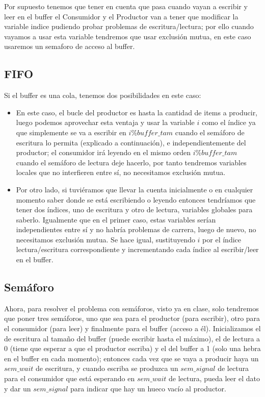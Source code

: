 \documentclass[11pt]{article}
\theoremstyle{ejercicio-style}
\begin{document}
Por supuesto tenemos que tener en cuenta que pasa cuando vayan a escribir y leer en el buffer el Consumidor y el Productor van a tener que modificar la variable indice pudiendo probar problemas de escritura/lectura; por ello cuando vayamos a usar esta variable tendremos que usar exclusión mutua, en este caso usaremos un semaforo de acceso al buffer.
\subsection*{FIFO}
\label{sec::lifo}
Si el buffer es una cola, tenemos dos posibilidades en este caso:
\begin{itemize}
	\item En este caso, el bucle del productor es hasta la cantidad de items a producir, luego podemos aprovechar esta ventaja y usar la variable $i$ como el índice ya que simplemente se va a escribir en $i \% buffer\_tam$ cuando el semáforo de escritura lo permita (explicado a continuación), e independientemente del productor; el consumidor irá leyendo en el mismo orden $i \% buffer\_tam$ cuando el semáforo de lectura deje hacerlo, por tanto tendremos variables locales que no interfieren entre sí, no necesitamos exclusión mutua.

	\item Por otro lado, si tuviéramos que llevar la cuenta inicialmente o en cualquier momento saber donde se está escribiendo o leyendo entonces tendríamos que tener dos índices, uno de escritura y otro de lectura, variables globales para saberlo. Igualmente que en el primer caso, estas variables serían independientes entre sí y no habría problemas de carrera, luego de nuevo, no necesitamos exclusión mutua. Se hace igual, sustituyendo $i$ por el índice lectura/escritura correspondiente y incrementando cada índice al escribir/leer en el buffer.
\end{itemize}

\subsection*{Semáforo}
\label{sec::semaforo}
Ahora, para resolver el problema con semáforos, visto ya en clase, solo tendremos que poner tres semáforos, uno que sea para el productor (para escribir), otro para el consumidor (para leer) y finalmente para el buffer (acceso a él). Inicializamos el de escritura al tamaño del buffer (puede escribir hasta el máximo), el de lectura a 0 (tiene que esperar a que el productor escriba) y el del buffer a 1 (solo una hebra en el buffer en cada momento); entonces cada vez que se vaya a producir haya un $sem\_wait$ de escritura, y cuando escriba se produzca un $sem\_signal$ de lectura para el consumidor que está esperando en $sem\_wait$ de lectura, pueda leer el dato y dar un $sem\_signal$ para indicar que hay un hueco vacío al productor. \\
\end{document}
